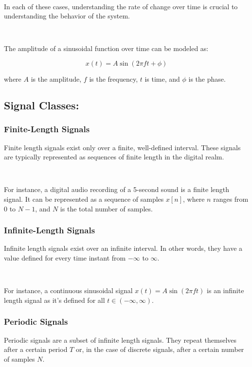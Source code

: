 \documentclass[11pt]{article}
\begin{document}
\ 


In each of these cases, understanding the rate of change over time is crucial to understanding the behavior of the system.

\ 

The amplitude of a sinusoidal function over time can be modeled as:

\[ x(t) = A \sin(2 \pi f t + \phi) \]

where $A$ is the amplitude, $f$ is the frequency, $t$ is time, and $\phi$ is the phase.


\subsection*{Signal Classes:}

\subsubsection*{Finite-Length Signals}

Finite length signals exist only over a finite, well-defined interval. These signals are typically represented as sequences of finite length in the digital realm. 

\ 


For instance, a digital audio recording of a 5-second sound is a finite length signal. It can be represented as a sequence of samples $x[n]$, where $n$ ranges from 0 to $N-1$, and $N$ is the total number of samples.

\subsubsection*{Infinite-Length Signals}

Infinite length signals exist over an infinite interval. In other words, they have a value defined for every time instant from $-\infty$ to $\infty$.

\ 


For instance, a continuous sinusoidal signal $x(t) = A\sin(2\pi f t)$ is an infinite length signal as it's defined for all $t \in (-\infty, \infty)$.

\subsubsection*{Periodic Signals}

Periodic signals are a subset of infinite length signals. They repeat themselves after a certain period $T$ or, in the case of discrete signals, after a certain number of samples $N$. 
\end{document}
